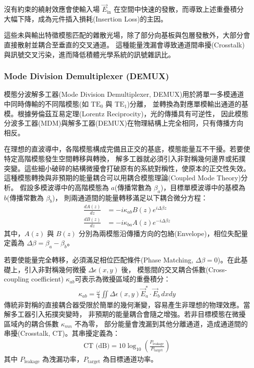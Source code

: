 沒有約束的繞射效應會使輸入場 $\vec{E}_{\text{in}}$ 在空間中快速的發散，而導致上述重疊積分大幅下降，成為元件插入損耗(Insertion Loss)的主因。

這些未與輸出特徵模態匹配的雜散光場，除了部分向基板與包層發散外，大部分會直接散射並耦合至垂直的交叉通道。
這種能量洩漏會導致通道間串擾(Crosstalk)與訊號交叉污染，進而降低積體光學系統的訊號雜訊比。\

\subsubsection{Mode Division Demultiplexer (DEMUX)}
模態分波解多工器(Mode Division Demultiplexer, DEMUX)用於將單一多模通道中同時傳輸的不同階模態(如 $\text{TE}_0$ 與 $\text{TE}_1$)分離，
並轉換為對應單模輸出通道的基模。根據勞倫茲互易定理(Lorentz Reciprocity)，光的傳播具有可逆性，
因此模態分波多工器(MDM)與解多工器(DEMUX)在物理結構上完全相同，只有傳播方向相反。

在理想的直波導中，各階模態構成完備且正交的基底，模態能量互不干擾。若要使特定高階模態發生空間轉移與轉換，
解多工器就必須引入非對稱幾何邊界或拓撲突變。這些細小破碎的結構微擾會打破原有的系統對稱性，使原本的正交性失效。
這種模態轉換與非預期的能量耦合可以用耦合模態理論(Coupled Mode Theory)\cite{yariv2007_photonics}分析。
假設多模波導中的高階模態為 $a$(傳播常數為 $\beta_a$)，目標單模波導中的基模為 $b$(傳播常數為 $\beta_b$)，
則兩通道間的能量轉移滿足以下耦合微分方程：
\begin{align}
\frac{dA(z)}{dz} &= -i \kappa_{ab} B(z) e^{i\Delta\beta z} \\
\frac{dB(z)}{dz} &= -i \kappa_{ba} A(z) e^{-i\Delta\beta z}
\label{eq:mode coupling of directional coupler}
\end{align}
其中，$A(z)$ 與 $B(z)$ 分別為兩模態沿傳播方向的包絡(Envelope)，相位失配量定義為 $\Delta\beta = \beta_a - \beta_b$。

若要使能量完全轉移，必須滿足相位匹配條件(Phase Matching, $\Delta\beta = 0$)。在此基礎上，引入非對稱幾何微擾 $\Delta \epsilon(x,y)$ 後，
模態間的交叉耦合係數(Cross-coupling coefficient) \cite{yariv2007_photonics}$\kappa_{ab}$可表示為微擾區域的重疊積分：
\begin{align}
\kappa_{ab} = \frac{\omega}{4} \iint \Delta \epsilon(x,y) \vec{E}_a^* \cdot \vec{E}_b \, dx dy
\label{eq:mode cross coupling coefficient}
\end{align}
傳統非對稱的直接耦合器受限於簡單的幾何漸變，容易產生非理想的物理效應。當解多工器引入拓撲突變時，
非預期的能量耦合會隨之增強。若非目標模態在微擾區域內的耦合係數 $\kappa_{mn}$ 不為零，
部分能量會洩漏到其他分離通道，造成通道間的串擾(Crosstalk, CT)。其串擾定義為：
\begin{align}
\text{CT (dB)} = 10 \log_{10} \left( \frac{P_{\text{leakage}}}{P_{\text{target}}} \right)
\label{eq:crosstalk}
\end{align}
其中 $P_{\text{leakage}}$ 為洩漏功率，$P_{\text{target}}$ 為目標通道功率。

